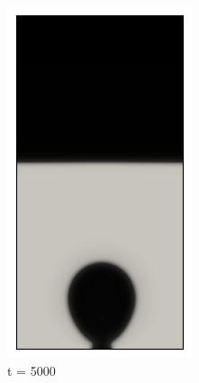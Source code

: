 \begin{figure}[h!]
	\centering %
	\begin{subfigure}{0.25\textwidth}
		\includegraphics[width=\linewidth]{figs/cap4/bubble_5}
		\caption{t = 5000}
		\label{fig:1}
	\end{subfigure}\hfil %
	\begin{subfigure}{0.25\textwidth}

\end{subfigure}
\end{figure}
